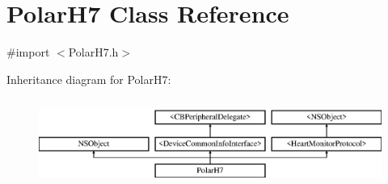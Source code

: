 \hypertarget{interface_polar_h7}{\section{Polar\-H7 Class Reference}
\label{interface_polar_h7}
}


{\ttfamily \#import $<$Polar\-H7.\-h$>$}

Inheritance diagram for Polar\-H7\-:\begin{figure}[H]
\begin{center}
\leavevmode
\includegraphics[height=2.901554cm]{interface_polar_h7}
\end{center}
\end{figure}
